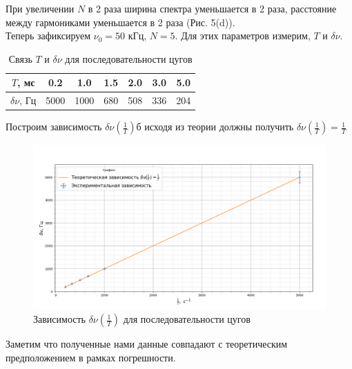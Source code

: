 \documentclass[a4paper, 12pt]{article}%
\begin{document}
 	При увеличении $N$ в 2 раза ширина спектра уменьшается в 2 раза, расстояние между гармониками уменьшается в 2 раза (Рис. 5(d)). \\
 	Теперь зафиксируем $\nu_0 = 50$ кГц, $N = 5$. Для этих параметров измерим, $T$ и  $\delta \nu$.
 	\begin{table}[H]
 		\centering
 		\begin{tabular}{|c|c|c|c|c|c|c|}
 			\hline
 			$T$, мс  & 0.2  & 1.0  & 1.5 & 2.0 & 3.0 & 5.0 \\ \hline
 			 $\delta \nu$, Гц& 5000 & 1000 & 680 & 508 & 336 & 204 \\ \hline
 		\end{tabular}
 		\caption{Связь $T$ и  $\delta \nu$ для последовательности цугов}
 	\end{table}
 	Построим зависимость $\delta \nu(\frac{1}{T})$б исходя из теории должны получить $\delta \nu(\frac{1}{T}) = \frac{1}{T}$
 	\begin{figure}[H]
 		\centering
 		\includegraphics[width=0.9\linewidth]{завис_2}
 		\caption{Зависимость $\delta \nu(\frac{1}{T})$ для последовательности цугов}
 		\label{fig:2}
 	\end{figure}
 	Заметим что полученные нами данные совпадают с теоретическим предположением в рамках погрешности.
\end{document}
